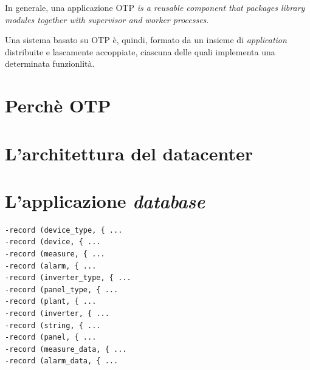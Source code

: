 %
In generale, una applicazione OTP \emph{is a reusable component that packages library modules 
together with supervisor and worker processes}\cite{cesarini09}.

%
Una sistema basato su OTP \`e, quindi, formato da un insieme di \emph{application} distribuite 
e lascamente accoppiate, ciascuna delle quali implementa una determinata funzionlit\`a.
%

%
\section{Perch\`e OTP}














\section{L'architettura del datacenter}
\label{datacenter-arch}
%
\section{L'applicazione \emph{database}}
%
\begin{lstlisting}[caption={Record per interfacciamento con il database}, label={code:database-record},frame=trBL]
-record (device_type, { ...
-record (device, { ...
-record (measure, { ...
-record (alarm, { ...
-record (inverter_type, { ...
-record (panel_type, { ...
-record (plant, { ...
-record (inverter, { ...
-record (string, { ...
-record (panel, { ...
-record (measure_data, { ...
-record (alarm_data, { ...
\end{lstlisting}
%


